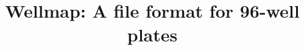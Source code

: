 \documentclass{bmcart}
\begin{document}
\begin{frontmatter}

\begin{fmbox}


\title{Wellmap: A file format for 96-well plates}


\author[
   addressref={wyss},                   %
   email={kale@thekunderts.net}         %
]{ }


\address[id=wyss]{%
  ,
  ,
}


\begin{artnotes}
\end{artnotes}


\end{fmbox}
\end{frontmatter}
\end{document}
